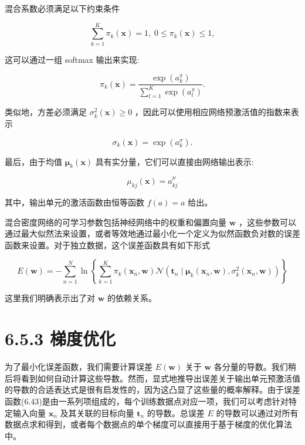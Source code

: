 \documentclass[10pt]{report}
\begin{document}
混合系数必须满足以下约束条件

\[
\mathop{\sum }\limits_{{k = 1}}^{K}{\pi }_{k}\left( \mathbf{x}\right)  = 1,\;0 \leq  {\pi }_{k}\left( \mathbf{x}\right)  \leq  1, \tag{6.39}
\]

这可以通过一组 softmax 输出来实现:

\[
{\pi }_{k}\left( \mathbf{x}\right)  = \frac{\exp \left( {a}_{k}^{\pi }\right) }{\mathop{\sum }\limits_{{l = 1}}^{K}\exp \left( {a}_{l}^{\pi }\right) }. \tag{6.40}
\]

类似地，方差必须满足 \({\sigma }_{k}^{2}\left( \mathbf{x}\right)  \geq  0\) ，因此可以使用相应网络预激活值的指数来表示

\[
{\sigma }_{k}\left( \mathbf{x}\right)  = \exp \left( {a}_{k}^{\sigma }\right) . \tag{6.41}
\]

最后，由于均值 \({\mathbf{\mu }}_{k}\left( \mathbf{x}\right)\) 具有实分量，它们可以直接由网络输出表示:

\[
{\mu }_{kj}\left( \mathbf{x}\right)  = {a}_{kj}^{\mu } \tag{6.42}
\]

其中，输出单元的激活函数由恒等函数 \(f\left( a\right)  = a\) 给出。

混合密度网络的可学习参数包括神经网络中的权重和偏置向量 \(\mathbf{w}\) ，这些参数可以通过最大似然法来设置，或者等效地通过最小化一个定义为似然函数负对数的误差函数来设置。对于独立数据，这个误差函数具有如下形式

\[
E\left( \mathbf{w}\right)  =  - \mathop{\sum }\limits_{{n = 1}}^{N}\ln \left\{  {\mathop{\sum }\limits_{{k = 1}}^{K}{\pi }_{k}\left( {{\mathbf{x}}_{n},\mathbf{w}}\right) \mathcal{N}\left( {{\mathbf{t}}_{n} \mid  {\mathbf{\mu }}_{k}\left( {{\mathbf{x}}_{n},\mathbf{w}}\right) ,{\sigma }_{k}^{2}\left( {{\mathbf{x}}_{n},\mathbf{w}}\right) }\right) }\right\}   \tag{6.43}
\]

这里我们明确表示出了对 \(\mathbf{w}\) 的依赖关系。

\section*{6.5.3 梯度优化}

为了最小化误差函数，我们需要计算误差 \(E\left( \mathbf{w}\right)\) 关于 \(\mathbf{w}\) 各分量的导数。我们稍后将看到如何自动计算这些导数。然而，显式地推导出误差关于输出单元预激活值的导数的合适表达式是很有启发性的，因为这凸显了这些量的概率解释。由于误差函数(6.43)是由一系列项组成的，每个训练数据点对应一项，我们可以考虑针对特定输入向量 \({\mathbf{x}}_{n}\) 及其关联的目标向量 \({\mathbf{t}}_{n}\) 的导数。总误差 \(E\) 的导数可以通过对所有数据点求和得到，或者每个数据点的单个梯度可以直接用于基于梯度的优化算法中。
\end{document}
